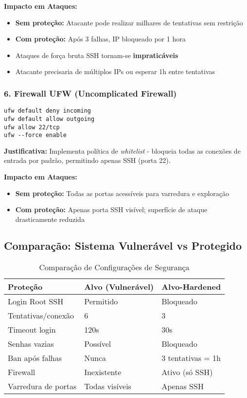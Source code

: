 \documentclass[12pt]{article}
\begin{document}
\textbf{Impacto em Ataques:}
\begin{itemize}
    \item \textbf{Sem proteção:} Atacante pode realizar milhares de tentativas sem restrição
    \item \textbf{Com proteção:} Após 3 falhas, IP bloqueado por 1 hora
    \item Ataques de força bruta SSH tornam-se \textbf{impraticáveis}
    \item Atacante precisaria de múltiplos IPs ou esperar 1h entre tentativas
\end{itemize}

\subsubsection{6. Firewall UFW (Uncomplicated Firewall)}
\begin{verbatim}
ufw default deny incoming
ufw default allow outgoing
ufw allow 22/tcp
ufw --force enable
\end{verbatim}

\textbf{Justificativa:} Implementa política de \emph{whitelist} - bloqueia todas as conexões de entrada por padrão, permitindo apenas SSH (porta 22).

\textbf{Impacto em Ataques:}
\begin{itemize}
    \item \textbf{Sem proteção:} Todas as portas acessíveis para varredura e exploração
    \item \textbf{Com proteção:} Apenas porta SSH visível; superfície de ataque drasticamente reduzida
\end{itemize}

\subsection{Comparação: Sistema Vulnerável vs Protegido}

\begin{table}[h]
\centering
\begin{tabular}{|l|l|l|}
\hline
\textbf{Proteção} & \textbf{Alvo (Vulnerável)} & \textbf{Alvo-Hardened} \\ \hline
Login Root SSH & Permitido & Bloqueado \\ \hline
Tentativas/conexão & 6 & 3 \\ \hline
Timeout login & 120s & 30s \\ \hline
Senhas vazias & Possível & Bloqueado \\ \hline
Ban após falhas & Nunca & 3 tentativas = 1h \\ \hline
Firewall & Inexistente & Ativo (só SSH) \\ \hline
Varredura de portas & Todas visíveis & Apenas SSH \\ \hline
\end{tabular}
\caption{Comparação de Configurações de Segurança}
\end{table}
\end{document}
